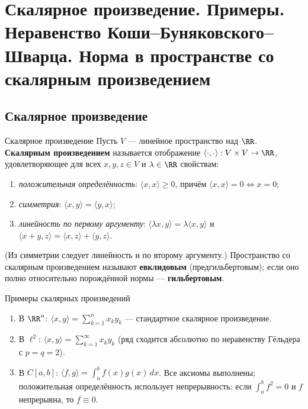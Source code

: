 
\section{Скалярное произведение. Примеры. Неравенство Коши--Буняковского--Шварца. Норма в пространстве со скалярным произведением}

\subsection*{Скалярное произведение}

\begin{Definition}{Скалярное произведение}{}
	Пусть $V$ --- линейное пространство над $\RR$. \textbf{Скалярным
	произведением} называется отображение
	$\langle\cdot,\cdot\rangle:V\times V\to\RR$, удовлетворяющее для всех
	$x,y,z\in V$ и $\lambda\in\RR$ свойствам:
	\begin{enumerate}
		\item \emph{положительная определённость}:
		$\langle x,x\rangle\ge0$, причём $\langle x,x\rangle=0\iff x=0$;
		\item \emph{симметрия}: $\langle x,y\rangle=\langle y,x\rangle$;
		\item \emph{линейность по первому аргументу}:
		$\langle\lambda x,y\rangle=\lambda\langle x,y\rangle$ и
		$\langle x+y,z\rangle=\langle x,z\rangle+\langle y,z\rangle$.
	\end{enumerate}
	(Из симметрии следует линейность и по второму аргументу.) Пространство со
	скалярным произведением называют \textbf{евклидовым} (предгильбертовым); если
	оно полно относительно порождённой нормы --- \textbf{гильбертовым}.
\end{Definition}

\begin{Example}{Примеры скалярных произведений}{}
	\begin{enumerate}
		\item В $\RR^n$: $\langle x,y\rangle=\sum_{k=1}^{n} x_k y_k$ ---
		стандартное скалярное произведение.
		\item В $\ell^2$: $\langle x,y\rangle=\sum_{k=1}^{\infty} x_k y_k$ (ряд
		сходится абсолютно по неравенству Гёльдера с $p=q=2$).
		\item В $C[a,b]$: $\langle f,g\rangle=\int_a^b f(x)g(x)\,dx$. Все аксиомы
		выполнены; положительная определённость использует непрерывность: если
		$\int_a^b f^2=0$ и $f$ непрерывна, то $f\equiv0$.
	\end{enumerate}
\end{Example}

